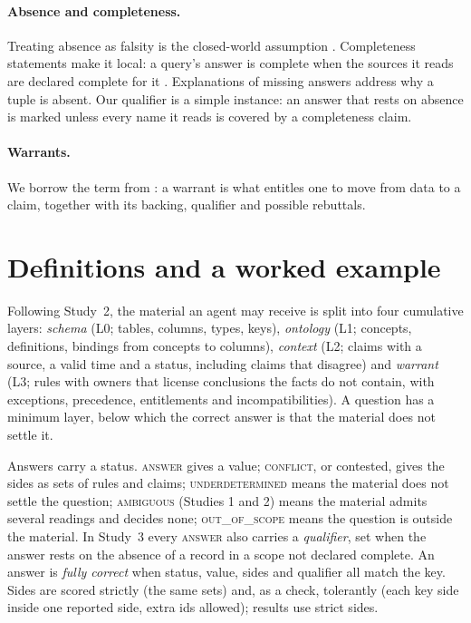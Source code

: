 \documentclass[11pt]{article}
\newcommand{\st}[1]{\textsc{#1}}
\begin{document}
\paragraph{Absence and completeness.} Treating absence as falsity is the closed-world assumption
\citep{reiter1978cwa}. Completeness statements make it local: a query's answer is complete when the sources it reads
are declared complete for it \citep{levy1996complete,razniewski2011complete,darari2013rdf}. Explanations of missing
answers \citep{chapman2009whynot} address why a tuple is absent. Our qualifier is a simple instance: an answer that
rests on absence is marked unless every name it reads is covered by a completeness claim.

\paragraph{Warrants.} We borrow the term from \citet{toulmin1958}: a warrant is what entitles one to move from data
to a claim, together with its backing, qualifier and possible rebuttals.

\section{Definitions and a worked example}
\label{sec:defs}

Following Study~2, the material an agent may receive is split into four cumulative layers: \emph{schema} (L0;
tables, columns, types, keys), \emph{ontology} (L1; concepts, definitions, bindings from concepts to columns),
\emph{context} (L2; claims with a source, a valid time and a status, including claims that disagree) and
\emph{warrant} (L3; rules with owners that license conclusions the facts do not contain, with exceptions,
precedence, entitlements and incompatibilities). A question has a minimum layer, below which the correct answer is
that the material does not settle it.

Answers carry a status. \st{answer} gives a value; \st{conflict}, or contested, gives the sides as sets of rules and
claims; \st{underdetermined} means the material does not settle the question; \st{ambiguous} (Studies 1 and 2)
means the material admits several readings and decides none; \st{out\_of\_scope} means the question is outside the
material. In Study~3 every \st{answer} also carries a \emph{qualifier}, set when the answer rests on the absence of
a record in a scope not declared complete. An answer is \emph{fully correct} when status, value, sides and
qualifier all match the key. Sides are scored strictly (the same sets) and, as a check, tolerantly (each key side
inside one reported side, extra ids allowed); results use strict sides.
\end{document}
